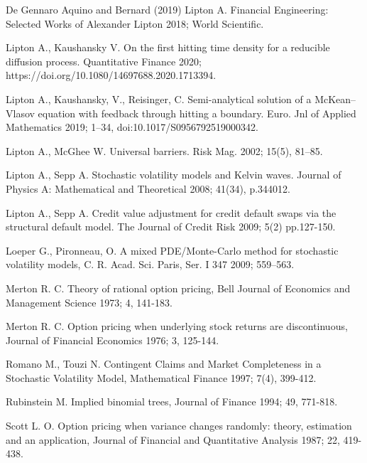 \documentclass{article}
\begin{document}
\begin{thebibliography}{De Gennaro Aquino and Bernard (2019)}
 Lipton A. Financial Engineering:
Selected Works of Alexander Lipton 2018; World Scientific.

 Lipton A., Kaushansky V.
On the first hitting time density for a reducible diffusion process.
Quantitative Finance 2020; https://doi.org/10.1080/14697688.2020.1713394.

 Lipton A., Kaushansky,
V., Reisinger, C. Semi-analytical solution of a McKean--Vlasov equation with
feedback through hitting a boundary. Euro. Jnl of Applied Mathematics 2019;
1--34, doi:10.1017/S0956792519000342.

 Lipton A., McGhee W.
Universal barriers. Risk Mag. 2002; 15(5), 81--85.

 Lipton A., Sepp A. Stochastic
volatility models and Kelvin waves. Journal of Physics A: Mathematical and
Theoretical 2008; 41(34), p.344012.

 Lipton A., Sepp A. Credit value
adjustment for credit default swaps via the structural default model. The
Journal of Credit Risk 2009; 5(2) pp.127-150.

 Loeper G., Pironneau, O. A
mixed PDE/Monte-Carlo method for stochastic volatility models, C. R. Acad.
Sci. Paris, Ser. I 347 2009; 559--563.

 Merton R. C. Theory of rational option
pricing, Bell Journal of Economics and Management Science 1973; 4, 141-183.

 Merton R. C. Option pricing when
underlying stock returns are discontinuous, Journal of Financial Economics
1976; 3, 125-144.

 Romano M., Touzi N. Contingent
Claims and Market Completeness in a Stochastic Volatility Model,
Mathematical Finance 1997; 7(4), 399-412.

 Rubinstein M. Implied binomial
trees, Journal of Finance 1994; 49, 771-818.

 Scott L. O. Option pricing when variance
changes randomly: theory, estimation and an application, Journal of
Financial and Quantitative Analysis 1987; 22, 419-438.


\end{thebibliography}
\end{document}
